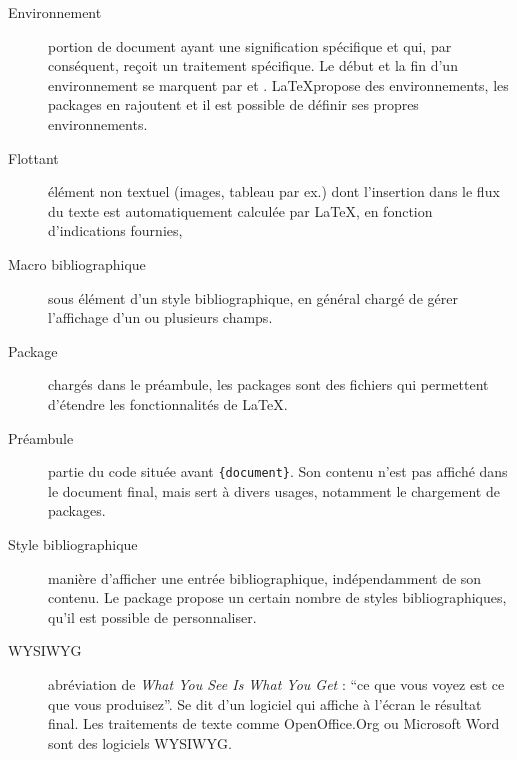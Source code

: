 \begin{description}
\item[Environnement] portion de document ayant une signification spécifique et qui, par conséquent, reçoit un traitement spécifique. Le début et la fin d'un environnement se marquent par  et . \LaTeX propose des environnements, les packages en rajoutent et il est possible de définir ses propres environnements.

\item[Flottant] élément non textuel (images, tableau par ex.) dont l'insertion dans le flux du texte est automatiquement calculée par \LaTeX, en fonction d'indications fournies, 

\item[Macro bibliographique] sous élément d'un style bibliographique, en général chargé de gérer l'affichage d'un ou plusieurs champs.

\item[Package] chargés dans le préambule, les packages sont des fichiers qui permettent d'étendre les fonctionnalités  de \LaTeX.

\item[Préambule] partie du code  située avant \verb|{document}|. Son contenu n'est pas affiché dans le document final, mais sert à divers usages, notamment le chargement de packages.

\item[Style bibliographique] manière d'afficher une entrée bibliographique, indépendamment de son contenu. Le package  propose un certain nombre de styles bibliographiques, qu'il est possible de personnaliser. 

\item[WYSIWYG] abréviation de \textenglish{\emph{What You See Is What You Get}} : \enquote{ce que vous voyez est ce que vous produisez}. Se dit d'un logiciel qui affiche à l'écran le résultat final. Les traitements de texte comme OpenOffice.Org ou Microsoft Word sont des logiciels WYSIWYG.
\end{description}
